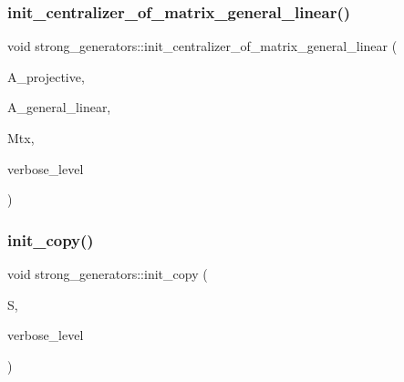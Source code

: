 \mbox{\label{classstrong__generators_a32d3dac9a96e73497b2e8f822d7e0038}} 
\subsubsection{\texorpdfstring{init\+\_\+centralizer\+\_\+of\+\_\+matrix\+\_\+general\+\_\+linear()}{init\_centralizer\_of\_matrix\_general\_linear()}}
{\footnotesize\ttfamily void strong\+\_\+generators\+::init\+\_\+centralizer\+\_\+of\+\_\+matrix\+\_\+general\+\_\+linear (\begin{DoxyParamCaption}\item[{\mbox{\hyperlink{classaction}{action}} $\ast$}]{A\+\_\+projective,  }\item[{\mbox{\hyperlink{classaction}{action}} $\ast$}]{A\+\_\+general\+\_\+linear,  }\item[{\mbox{\hyperlink{galois_8h_a09fddde158a3a20bd2dcadb609de11dc}{I\+NT}} $\ast$}]{Mtx,  }\item[{\mbox{\hyperlink{galois_8h_a09fddde158a3a20bd2dcadb609de11dc}{I\+NT}}}]{verbose\+\_\+level }\end{DoxyParamCaption})}

\mbox{\label{classstrong__generators_a52fade445eb96d43f47e1772b1b1219e}} 
\subsubsection{\texorpdfstring{init\+\_\+copy()}{init\_copy()}}
{\footnotesize\ttfamily void strong\+\_\+generators\+::init\+\_\+copy (\begin{DoxyParamCaption}\item[{\mbox{\hyperlink{classstrong__generators}{strong\+\_\+generators}} $\ast$}]{S,  }\item[{\mbox{\hyperlink{galois_8h_a09fddde158a3a20bd2dcadb609de11dc}{I\+NT}}}]{verbose\+\_\+level }\end{DoxyParamCaption})}

